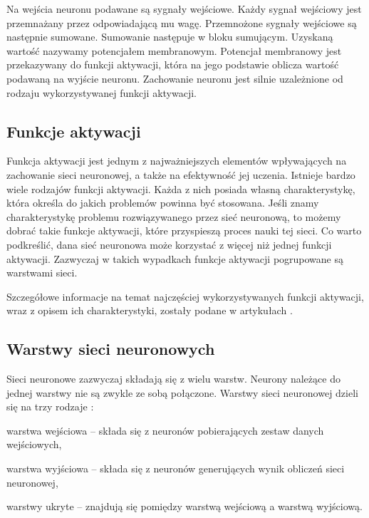 Na wejścia neuronu podawane są sygnały wejściowe. Każdy sygnał wejściowy jest przemnażany przez odpowiadającą mu wagę. Przemnożone sygnały wejściowe są następnie sumowane. Sumowanie następuje w bloku sumującym. Uzyskaną wartość nazywamy potencjałem membranowym.
Potencjał membranowy jest przekazywany do funkcji aktywacji, która na jego podstawie oblicza wartość podawaną na wyjście neuronu. Zachowanie neuronu jest silnie uzależnione od rodzaju wykorzystywanej funkcji aktywacji.

\subsection{Funkcje aktywacji}
Funkcja aktywacji jest jednym z najważniejszych elementów wpływających na zachowanie sieci neuronowej, a także na efektywność jej uczenia. Istnieje bardzo wiele rodzajów funkcji aktywacji. Każda z nich posiada własną charakterystykę, która określa do jakich problemów powinna być stosowana. Jeśli znamy charakterystykę problemu rozwiązywanego przez sieć neuronową, to możemy dobrać takie funkcje aktywacji, które przyspieszą proces nauki tej sieci. Co warto podkreślić, dana sieć neuronowa może korzystać z więcej niż jednej funkcji aktywacji. Zazwyczaj w takich wypadkach funkcje aktywacji pogrupowane są warstwami sieci.

Szczegółowe informacje na temat najczęściej wykorzystywanych funkcji aktywacji, wraz z opisem ich charakterystyki, zostały podane w artykułach \cite{activationFunction:article:1}\cite{activationFunction:article:2}\cite{activationFunction:article:3}.

\subsection{Warstwy sieci neuronowych}
Sieci neuronowe zazwyczaj składają się z wielu warstw. Neurony należące do jednej warstwy nie są zwykle ze sobą połączone. Warstwy sieci neuronowej dzieli się na trzy rodzaje \cite{neuralNetworks:introduction}:
\begin{itemize*}
\item warstwa wejściowa -- składa się z neuronów pobierających zestaw danych
wejściowych,
\item warstwa wyjściowa -- składa się z neuronów generujących wynik obliczeń
sieci neuronowej,
\item warstwy ukryte -- znajdują się pomiędzy warstwą wejściową a warstwą wyjściową.
\end{itemize*}

